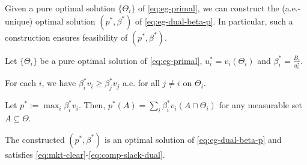 Given a pure optimal solution $\{\Theta_i\}$ of \eqref{eq:eg-primal}, we can construct the (a.e.-unique) optimal solution $(p^*, \beta^*)$ of \eqref{eq:eg-dual-beta-p}. In particular, such a construction ensures feasibility of $(p^*, \beta^*)$. 
\begin{corollary}
	Let $\{\Theta_i\}$ be a pure optimal solution of \eqref{eq:eg-primal}, $u^*_i = v_i(\Theta_i)$ and $\beta^*_i = \frac{B_i}{u^*_i}$.
	\begin{enumerate*}[label=(\alph*)]
		\item For each $i$, we have $\beta^*_i v_i \geq \beta^*_j v_j$ a.e. for all $j\neq i$ on $\Theta_i$. \label{item:thm-eg-pure-solution-gives-dual-feas}
		\item Let $p^* := \max_i \beta^*_i v_i$. Then, $p^*(A) = \sum_i \beta^*_i v_i(A\cap \Theta_i)$ for any measurable set $A\subseteq \Theta$.
		\label{item:thm-eg-pure-solution-gives-p*}
		\item The constructed $(p^*, \beta^*)$ is an optimal solution of \eqref{eq:eg-dual-beta-p} and satisfies \eqref{eq:mkt-clear}-\eqref{eq:comp-slack-dual}. 
		\label{item:thm-eg-pure-solution-gives-dual-opt}
	\end{enumerate*}
	 \label{cor:eg-pure-solution-gives-strong-duality}
\end{corollary}

